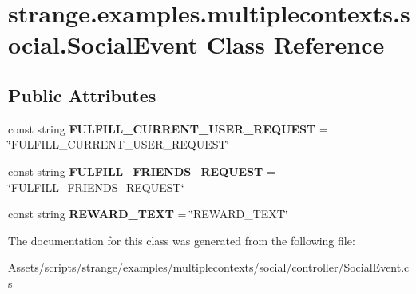 \hypertarget{classstrange_1_1examples_1_1multiplecontexts_1_1social_1_1_social_event}{\section{strange.\-examples.\-multiplecontexts.\-social.\-Social\-Event Class Reference}
\label{classstrange_1_1examples_1_1multiplecontexts_1_1social_1_1_social_event}
}
\subsection*{Public Attributes}
\begin{DoxyCompactItemize}
\item 
\hypertarget{classstrange_1_1examples_1_1multiplecontexts_1_1social_1_1_social_event_aa9fdd32248d515fc6a08abf01fdcfdf6}{const string {\bfseries F\-U\-L\-F\-I\-L\-L\-\_\-\-C\-U\-R\-R\-E\-N\-T\-\_\-\-U\-S\-E\-R\-\_\-\-R\-E\-Q\-U\-E\-S\-T} = \char`\"{}F\-U\-L\-F\-I\-L\-L\-\_\-\-C\-U\-R\-R\-E\-N\-T\-\_\-\-U\-S\-E\-R\-\_\-\-R\-E\-Q\-U\-E\-S\-T\char`\"{}}\label{classstrange_1_1examples_1_1multiplecontexts_1_1social_1_1_social_event_aa9fdd32248d515fc6a08abf01fdcfdf6}

\item 
\hypertarget{classstrange_1_1examples_1_1multiplecontexts_1_1social_1_1_social_event_a390e0feb4d9d92e39e8c14a8d1948d6c}{const string {\bfseries F\-U\-L\-F\-I\-L\-L\-\_\-\-F\-R\-I\-E\-N\-D\-S\-\_\-\-R\-E\-Q\-U\-E\-S\-T} = \char`\"{}F\-U\-L\-F\-I\-L\-L\-\_\-\-F\-R\-I\-E\-N\-D\-S\-\_\-\-R\-E\-Q\-U\-E\-S\-T\char`\"{}}\label{classstrange_1_1examples_1_1multiplecontexts_1_1social_1_1_social_event_a390e0feb4d9d92e39e8c14a8d1948d6c}

\item 
\hypertarget{classstrange_1_1examples_1_1multiplecontexts_1_1social_1_1_social_event_a26a283ef4779cb7d6e79fe566694eccd}{const string {\bfseries R\-E\-W\-A\-R\-D\-\_\-\-T\-E\-X\-T} = \char`\"{}R\-E\-W\-A\-R\-D\-\_\-\-T\-E\-X\-T\char`\"{}}\label{classstrange_1_1examples_1_1multiplecontexts_1_1social_1_1_social_event_a26a283ef4779cb7d6e79fe566694eccd}

\end{DoxyCompactItemize}


The documentation for this class was generated from the following file\-:\begin{DoxyCompactItemize}
\item 
Assets/scripts/strange/examples/multiplecontexts/social/controller/Social\-Event.\-cs\end{DoxyCompactItemize}
